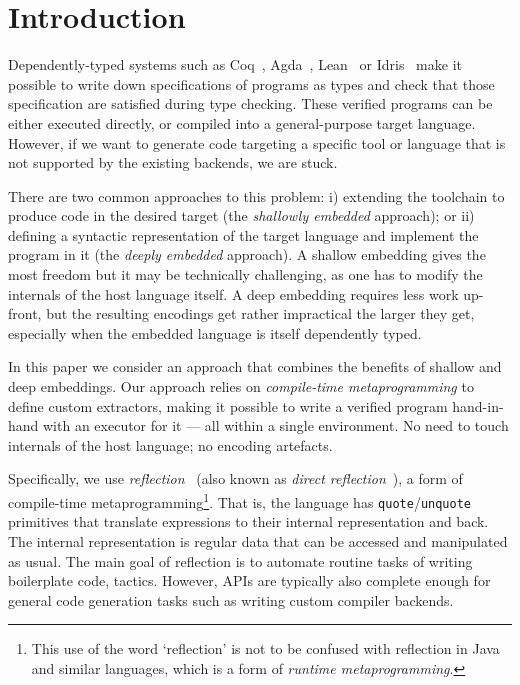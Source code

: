 \documentclass[acmsmall,review,anonymous]{acmart}\settopmatter{printfolios=true,printccs=false,printacmref=false}
\begin{document}
\section{Introduction}

Dependently-typed systems such as Coq~\cite{10.5555/1965123},
Agda~\cite{10.5555/1813347.1813352}, Lean~\cite{conf/cade/MouraKADR15}
or Idris~\cite{JFP:9060502} make it possible to write down specifications
of programs as types and check that those specification are satisfied
during type checking. These verified programs can be either executed
directly, or compiled into a
general-purpose target language.  However, if we want to generate code
targeting a specific tool or language that is not supported by the
existing backends, we are stuck.

There are two common approaches to this problem: i) extending the
toolchain to produce code in the desired target (the \emph{shallowly
embedded} approach); or ii) defining a syntactic representation of the
target language and implement the program in it (the \emph{deeply
embedded} approach). A shallow embedding gives the most freedom but it
may be technically challenging, as one has to modify the internals of
the host language itself.  A deep embedding requires less work
up-front, but the resulting encodings get rather impractical the
larger they get, especially when the embedded language is itself
dependently typed.

In this paper we consider an approach that combines the benefits of
shallow and deep embeddings. Our approach relies on \emph{compile-time
metaprogramming} to define custom extractors, making it possible to
write a verified program hand-in-hand with an executor for it --- all
within a single environment.  No need to touch internals of the host
language; no encoding artefacts.

Specifically, we use
\emph{reflection}~\cite{idris-refl, lean-refl,metacoq,agda-refl} (also
known as \emph{direct reflection}~\cite{nuprl-refl}), a form of
compile-time metaprogramming\footnote{This use of the word
`reflection' is not to be confused with reflection in Java and similar
languages, which is a form of \emph{runtime metaprogramming}.}.
%
That is, the language has \texttt{quote}/\texttt{unquote}
primitives that translate expressions to their internal representation
and back.  The internal representation is regular data that can be
accessed and manipulated as usual.  The main goal of
reflection is to automate routine tasks of writing
boilerplate code, \eg{} tactics.  However,  APIs are
typically also complete enough for general
code generation tasks such as writing custom compiler backends.
\end{document}
